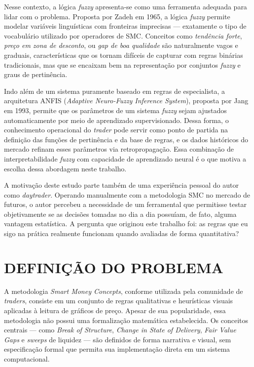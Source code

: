 Nesse contexto, a lógica \textit{fuzzy} apresenta-se como uma ferramenta adequada para lidar com o problema. Proposta por Zadeh em 1965, a lógica \textit{fuzzy} permite modelar variáveis linguísticas com fronteiras imprecisas --- exatamente o tipo de vocabulário utilizado por operadores de SMC. Conceitos como \textit{tendência forte}, \textit{preço em zona de desconto}, ou \textit{gap de boa qualidade} são naturalmente vagos e graduais, características que os tornam difíceis de capturar com regras binárias tradicionais, mas que se encaixam bem na representação por conjuntos \textit{fuzzy} e graus de pertinência.

Indo além de um sistema puramente baseado em regras de especialista, a arquitetura ANFIS (\textit{Adaptive Neuro-Fuzzy Inference System}), proposta por Jang em 1993, permite que os parâmetros de um sistema \textit{fuzzy} sejam ajustados automaticamente por meio de aprendizado supervisionado. Dessa forma, o conhecimento operacional do \textit{trader} pode servir como ponto de partida na definição das funções de pertinência e da base de regras, e os dados históricos do mercado refinam esses parâmetros via retropropagação. Essa combinação de interpretabilidade \textit{fuzzy} com capacidade de aprendizado neural é o que motiva a escolha dessa abordagem neste trabalho.

A motivação deste estudo parte também de uma experiência pessoal do autor como \textit{daytrader}. Operando manualmente com a metodologia SMC no mercado de futuros, o autor percebeu a necessidade de um ferramental que permitisse testar objetivamente se as decisões tomadas no dia a dia possuíam, de fato, alguma vantagem estatística. A pergunta que originou este trabalho foi: as regras que eu sigo na prática realmente funcionam quando avaliadas de forma quantitativa?


\section{\uppercase{Definição do Problema}}

A metodologia \textit{Smart Money Concepts}, conforme utilizada pela comunidade de \textit{traders}, consiste em um conjunto de regras qualitativas e heurísticas visuais aplicadas à leitura de gráficos de preço. Apesar de sua popularidade, essa metodologia não possui uma formalização matemática estabelecida. Os conceitos centrais --- como \textit{Break of Structure}, \textit{Change in State of Delivery}, \textit{Fair Value Gaps} e \textit{sweeps} de liquidez --- são definidos de forma narrativa e visual, sem especificação formal que permita sua implementação direta em um sistema computacional.

